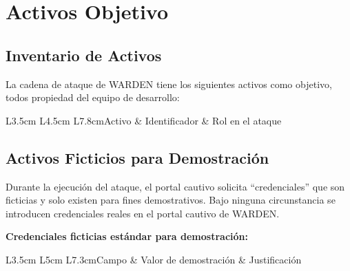 \documentclass[11pt,a4paper]{article}
\begin{document}
\section{Activos Objetivo}

\subsection{Inventario de Activos}
La cadena de ataque de WARDEN tiene los siguientes activos como objetivo,
todos propiedad del equipo de desarrollo:

\begin{datatable}{L{3.5cm} L{4.5cm} L{7.8cm}}{Activo & Identificador & Rol en el ataque}
\end{datatable}

\subsection{Activos Ficticios para Demostración}
Durante la ejecución del ataque, el portal cautivo solicita ``credenciales''
que son ficticias y solo existen para fines demostrativos. Bajo ninguna
circunstancia se introducen credenciales reales en el portal cautivo de
WARDEN.

\textbf{Credenciales ficticias estándar para demostración:}

\begin{datatable}{L{3.5cm} L{5cm} L{7.3cm}}{Campo & Valor de demostración & Justificación}
\end{datatable}

\end{document}
